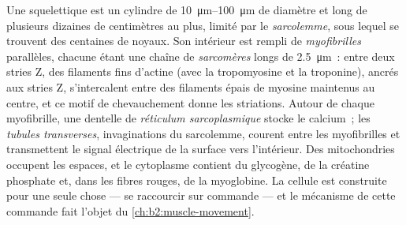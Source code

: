 \begin{definition}\label{def:b2:cell-differentiation:fibre}
Une  squelettique est un cylindre de
\qtyrange{10}{100}{\micro m} de diamètre et long de plusieurs dizaines
de centimètres au plus, limité par le \emph{sarcolemme}, sous lequel se
trouvent des centaines de noyaux. Son intérieur est rempli de
\emph{myofibrilles} parallèles, chacune étant une chaîne de
\emph{sarcomères} longs de \qty{2.5}{\micro m}~: entre deux stries Z,
des filaments fins d'actine (avec la tropomyosine et la troponine),
ancrés aux stries Z, s'intercalent entre des filaments épais de myosine
maintenus au centre, et ce motif de chevauchement donne les striations.
Autour de chaque myofibrille, une dentelle de \emph{réticulum
sarcoplasmique} stocke le calcium~; les \emph{tubules transverses},
invaginations du sarcolemme, courent entre les myofibrilles et
transmettent le signal électrique de la surface vers l'intérieur. Des
mitochondries occupent les espaces, et le cytoplasme contient du
glycogène, de la créatine phosphate et, dans les fibres rouges, de la
myoglobine. La cellule est construite pour une seule chose --- se
raccourcir sur commande --- et le mécanisme de cette commande fait
l'objet du
\cref{ch:b2:muscle-movement}.
\end{definition}

